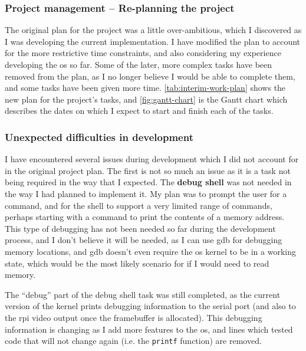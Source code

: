 \documentclass{article}
\begin{document}
\subsubsection{Project management -- Re-planning the project}
The original plan for the project was a little over-ambitious, which I
discovered as I was developing the current implementation. I have modified the
plan to account for the more restrictive time constraints, and also considering
my experience developing the \gls{os} so far. Some of the later, more complex
tasks have been removed from the plan, as I no longer believe I would be able
to complete them, and some tasks have been given more time.
\autoref{tab:interim-work-plan} shows the new plan for the project's tasks, and
\autoref{fig:gantt-chart} is the Gantt chart which describes the dates
on which I expect to start and finish each of the tasks.

\subsubsection{Unexpected difficulties in development}
I have encountered several issues during development which I did not account
for in the original project plan. The first is not so much an issue as it is a
task not being required in the way that I expected. The \textbf{debug shell}
was not needed in the way I had planned to implement it. My plan was to prompt
the user for a command, and for the shell to support a very limited range of
commands, perhaps starting with a command to print the contents of a memory
address. This type of debugging has not been needed so far during the
development process, and I don't believe it will be needed, as I can use
\gls{gdb} for debugging memory locations, and \gls{gdb} doesn't even require
the \gls{os} kernel to be in a working state, which would be the most likely
scenario for if I would need to read memory.

The ``debug'' part of the debug shell task was still completed, as the current
version of the kernel prints debugging information to the serial port (and also
to the \gls{rpi} video output once the framebuffer is allocated). This
debugging information is changing as I add more features to the \gls{os}, and
lines which tested code that will not change again (i.e. the \texttt{printf}
function) are removed.
\end{document}
